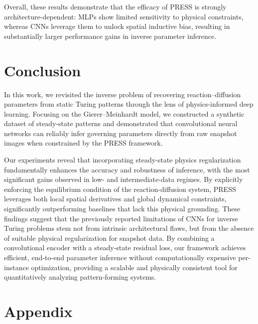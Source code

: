 \documentclass{article} %
\begin{document}
Overall, these results demonstrate that the efficacy of PRESS is strongly architecture-dependent: MLPs show limited sensitivity to physical constraints, whereas CNNs leverage them to unlock spatial inductive bias, resulting in substantially larger performance gains in inverse parameter inference.

\section{Conclusion}

In this work, we revisited the inverse problem of recovering reaction--diffusion parameters from static Turing patterns through the lens of physics-informed deep learning. Focusing on the Gierer--Meinhardt model, we constructed a synthetic dataset of steady-state patterns and demonstrated that convolutional neural networks can reliably infer governing parameters directly from raw snapshot images when constrained by the PRESS framework.

Our experiments reveal that incorporating steady-state physics regularization fundamentally enhances the accuracy and robustness of inference, with the most significant gains observed in low- and intermediate-data regimes. By explicitly enforcing the equilibrium condition of the reaction-diffusion system, PRESS leverages both local spatial derivatives and global dynamical constraints, significantly outperforming baselines that lack this physical grounding. These findings suggest that the previously reported limitations of CNNs for inverse Turing problems stem not from intrinsic architectural flaws, but from the absence of suitable physical regularization for snapshot data. By combining a convolutional encoder with a steady-state residual loss, our framework achieves efficient, end-to-end parameter inference without computationally expensive per-instance optimization, providing a scalable and physically consistent tool for quantitatively analyzing pattern-forming systems.




\appendix
\section{Appendix}
\end{document}
